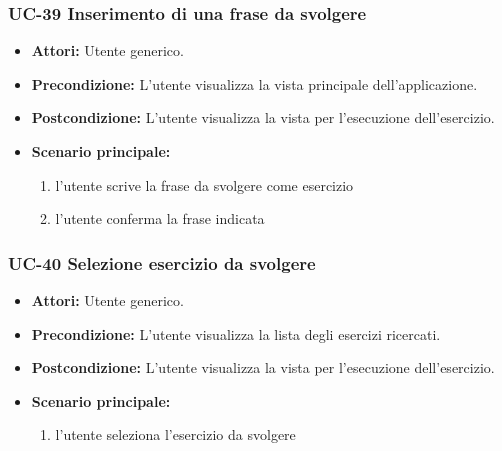 	\subsubsection{UC-39 Inserimento di una frase da svolgere}
	\begin{itemize}
		\item \textbf{Attori:} Utente generico.
		\item \textbf{Precondizione:} L'utente visualizza la vista principale dell'applicazione.
		\item \textbf{Postcondizione:} L'utente visualizza la vista per l'esecuzione dell'esercizio.
		\item \textbf{Scenario principale:}
		\begin{enumerate}
			\item l'utente scrive la frase da svolgere come esercizio
			\item l'utente conferma la frase indicata
		\end{enumerate}
	\end{itemize}

	\subsubsection{UC-40 Selezione esercizio da svolgere}
	\begin{itemize}
			\item \textbf{Attori:} Utente generico.
			\item \textbf{Precondizione:} L'utente visualizza la lista degli esercizi ricercati.
			\item \textbf{Postcondizione:} L'utente visualizza la vista per l'esecuzione dell'esercizio.
			\item \textbf{Scenario principale:}
			\begin{enumerate}
					\item l'utente seleziona l'esercizio da svolgere
			\end{enumerate}
	\end{itemize}

